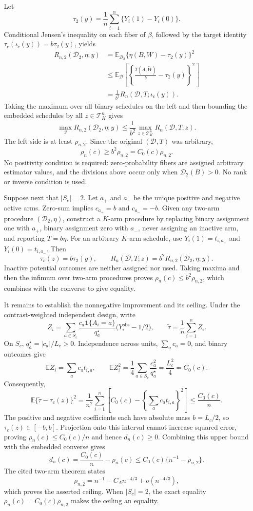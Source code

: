 Let
\[
 \tau_2(y)=\frac1n\sum_{i=1}^n\{Y_i(1)-Y_i(0)\}.
\]
Conditional Jensen's inequality on each fiber of \(\beta\), followed by the target identity \(\tau_c(\iota_c(y))=b\tau_2(y)\), yields
\[
 \begin{aligned}
 R_{n,2}(\mathcal D_2,\eta;y)
 &=\mathbb E_{\mathcal D_2}\{\eta(B,W)-\tau_2(y)\}^2\\
 &\leq \mathbb E_{\mathcal D}
 \left[\left\{\frac{T(A,\widetilde W)}b-\tau_2(y)\right\}^2\right]\\
 &=\frac1{b^2}R_n(\mathcal D,T;\iota_c(y)).
 \end{aligned}
\]
Taking the maximum over all binary schedules on the left and then bounding the embedded schedules by all \(z\in\mathcal T_K^n\) gives
\[
 \max_yR_{n,2}(\mathcal D_2,\eta;y)
 \leq \frac1{b^2}\max_{z\in\mathcal T_K^n}R_n(\mathcal D,T;z).
\]
The left side is at least \(\rho_{n,2}\).  Since the original \((\mathcal D,T)\) was arbitrary,
\[
 \rho_n(c)\geq b^2\rho_{n,2}=C_0(c)\rho_{n,2}.
\]
No positivity condition is required: zero-probability fibers are assigned arbitrary estimator values, and the divisions above occur only when \(\mathcal D_2(B)>0\).  No rank or inverse condition is used.

Suppose next that \(|S_c|=2\).  Let \(a_+\) and \(a_-\) be the unique positive and negative active arms.  Zero-sum implies \(c_{a_+}=b\) and \(c_{a_-}=-b\).  Given any two-arm procedure \((\mathcal D_2,\eta)\), construct a \(K\)-arm procedure by replacing binary assignment one with \(a_+\), binary assignment zero with \(a_-\), never assigning an inactive arm, and reporting \(T=b\eta\).  For an arbitrary \(K\)-arm schedule, use \(Y_i(1)=t_{i,a_+}\) and \(Y_i(0)=t_{i,a_-}\).  Then
\[
 \tau_c(z)=b\tau_2(y),
 \qquad
 R_n(\mathcal D,T;z)=b^2R_{n,2}(\mathcal D_2,\eta;y).
\]
Inactive potential outcomes are neither assigned nor used.  Taking maxima and then the infimum over two-arm procedures proves \(\rho_n(c)\leq b^2\rho_{n,2}\), which combines with the converse to give equality.

It remains to establish the nonnegative improvement and its ceiling.  Under the contrast-weighted independent design, write
\[
 Z_i=\sum_{a\in S_c}\frac{c_a\mathbf 1\{A_i=a\}}{q_a^\star}
 \bigl(Y_i^{\mathrm{obs}}-1/2\bigr),
 \qquad \widetilde\tau=\frac1n\sum_{i=1}^nZ_i.
\]
On \(S_c\), \(q_a^\star=|c_a|/L_c>0\).  Independence across units, \(\sum_ac_a=0\), and binary outcomes give
\[
 \mathbb E Z_i=\sum_ac_at_{i,a},
 \qquad
 \mathbb E Z_i^2=\frac14\sum_{a\in S_c}\frac{c_a^2}{q_a^\star}
 =\frac{L_c^2}{4}=C_0(c).
\]
Consequently,
\[
 \mathbb E\{\widetilde\tau-\tau_c(z)\}^2
 =\frac1{n^2}\sum_{i=1}^n
 \left[C_0(c)-\left\{\sum_ac_at_{i,a}\right\}^2\right]
 \leq\frac{C_0(c)}n.
\]
The positive and negative coefficients each have absolute mass \(b=L_c/2\), so \(\tau_c(z)\in[-b,b]\).  Projection onto this interval cannot increase squared error, proving \(\rho_n(c)\leq C_0(c)/n\) and hence \(d_n(c)\geq0\).  Combining this upper bound with the embedded converse gives
\[
 d_n(c)=\frac{C_0(c)}n-\rho_n(c)
 \leq C_0(c)\{n^{-1}-\rho_{n,2}\}.
\]
The cited two-arm theorem states
\[
 \rho_{n,2}=n^{-1}-C_A n^{-4/3}+o(n^{-4/3}),
\]
which proves the asserted ceiling.  When \(|S_c|=2\), the exact equality \(\rho_n(c)=C_0(c)\rho_{n,2}\) makes the ceiling an equality.